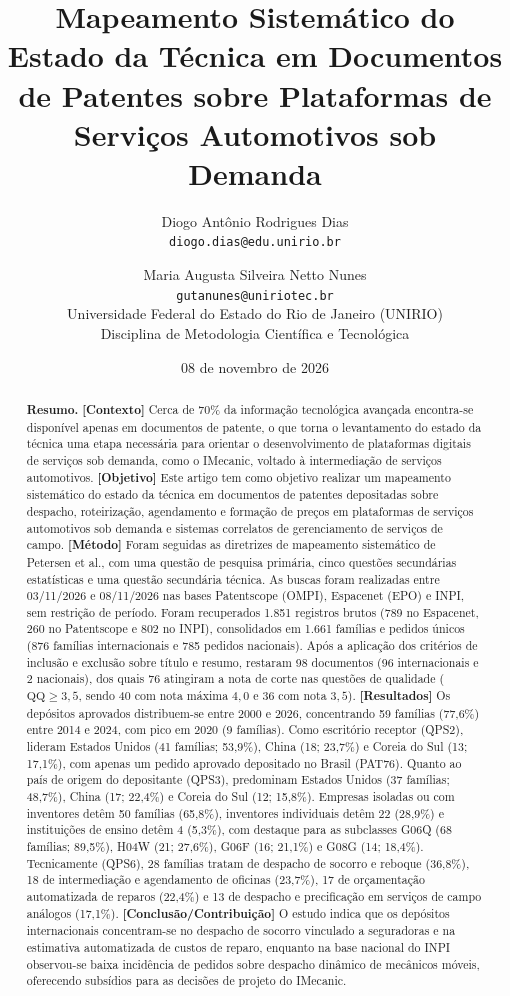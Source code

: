 \documentclass[12pt,a4paper]{article}
\title{\textbf{Mapeamento Sistemático do Estado da Técnica em Documentos de Patentes sobre Plataformas de Serviços Automotivos sob Demanda}}
\author{Diogo Antônio Rodrigues Dias \\ \texttt{diogo.dias@edu.unirio.br} \and
Maria Augusta Silveira Netto Nunes \\ \texttt{gutanunes@uniriotec.br}\\[4pt]
Universidade Federal do Estado do Rio de Janeiro (UNIRIO)\\
Disciplina de Metodologia Científica e Tecnológica}
\date{08 de novembro de 2026}
\begin{document}
\maketitle

\begin{abstract}
\noindent\textbf{Resumo.}
\textbf{[Contexto]} Cerca de 70\% da informação tecnológica avançada encontra-se disponível apenas em documentos de patente, o que torna o levantamento do estado da técnica uma etapa necessária para orientar o desenvolvimento de plataformas digitais de serviços sob demanda, como o IMecanic, voltado à intermediação de serviços automotivos.
\textbf{[Objetivo]} Este artigo tem como objetivo realizar um mapeamento sistemático do estado da técnica em documentos de patentes depositadas sobre despacho, roteirização, agendamento e formação de preços em plataformas de serviços automotivos sob demanda e sistemas correlatos de gerenciamento de serviços de campo.
\textbf{[Método]} Foram seguidas as diretrizes de mapeamento sistemático de Petersen et al., com uma questão de pesquisa primária, cinco questões secundárias estatísticas e uma questão secundária técnica. As buscas foram realizadas entre 03/11/2026 e 08/11/2026 nas bases Patentscope (OMPI), Espacenet (EPO) e INPI, sem restrição de período. Foram recuperados 1.851 registros brutos (789 no Espacenet, 260 no Patentscope e 802 no INPI), consolidados em 1.661 famílias e pedidos únicos (876 famílias internacionais e 785 pedidos nacionais). Após a aplicação dos critérios de inclusão e exclusão sobre título e resumo, restaram 98 documentos (96 internacionais e 2 nacionais), dos quais 76 atingiram a nota de corte nas questões de qualidade ($\text{QQ} \ge 3{,}5$, sendo 40 com nota máxima $4{,}0$ e 36 com nota $3{,}5$).
\textbf{[Resultados]} Os depósitos aprovados distribuem-se entre 2000 e 2026, concentrando 59 famílias (77,6\%) entre 2014 e 2024, com pico em 2020 (9 famílias). Como escritório receptor (QPS2), lideram Estados Unidos (41 famílias; 53,9\%), China (18; 23,7\%) e Coreia do Sul (13; 17,1\%), com apenas um pedido aprovado depositado no Brasil (PAT76). Quanto ao país de origem do depositante (QPS3), predominam Estados Unidos (37 famílias; 48,7\%), China (17; 22,4\%) e Coreia do Sul (12; 15,8\%). Empresas isoladas ou com inventores detêm 50 famílias (65,8\%), inventores individuais detêm 22 (28,9\%) e instituições de ensino detêm 4 (5,3\%), com destaque para as subclasses G06Q (68 famílias; 89,5\%), H04W (21; 27,6\%), G06F (16; 21,1\%) e G08G (14; 18,4\%). Tecnicamente (QPS6), 28 famílias tratam de despacho de socorro e reboque (36,8\%), 18 de intermediação e agendamento de oficinas (23,7\%), 17 de orçamentação automatizada de reparos (22,4\%) e 13 de despacho e precificação em serviços de campo análogos (17,1\%).
\textbf{[Conclusão/Contribuição]} O estudo indica que os depósitos internacionais concentram-se no despacho de socorro vinculado a seguradoras e na estimativa automatizada de custos de reparo, enquanto na base nacional do INPI observou-se baixa incidência de pedidos sobre despacho dinâmico de mecânicos móveis, oferecendo subsídios para as decisões de projeto do IMecanic.


\end{abstract}
\end{document}
